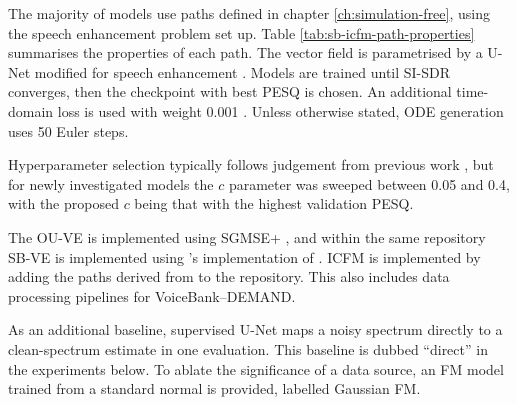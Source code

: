 The majority of models use paths defined in chapter \ref{ch:simulation-free}, using the speech enhancement problem set up. Table \ref{tab:sb-icfm-path-properties} summarises the properties of each path. The vector field is parametrised by a U-Net modified for speech enhancement \citep{richter2023speech}. Models are trained until \ac{SI-SDR} converges, then the checkpoint with best \ac{PESQ} is chosen. An additional time-domain loss is used with weight 0.001 \cite{jukic2024schr}. Unless otherwise stated, \ac{ODE} generation uses 50 Euler steps.

Hyperparameter selection typically follows judgement from previous work \citep{jukic2024schr,richter2023speech}, but for newly investigated models the $c$ parameter was sweeped between 0.05 and 0.4, with the proposed $c$ being that with the highest validation PESQ.

The \ac{OU-VE} is implemented using SGMSE+ \citep{richter2023speech}, and within the same repository \ac{SB-VE} is implemented using \citeauthor{richterInvestigatingTrainingObjectives2025}'s implementation of \cite{jukic2024schr}. \ac{ICFM} is implemented by adding the paths derived from \cite{tongImprovingGeneralizingFlowbased2024} to the repository. This also includes data processing pipelines for VoiceBank--DEMAND.


As an additional baseline, supervised U-Net maps a noisy spectrum directly to a clean-spectrum estimate in one evaluation. This baseline is dubbed ``direct'' in the experiments below. To ablate the significance of a data source, an \ac{FM} model trained from a standard normal is provided, labelled Gaussian FM.





